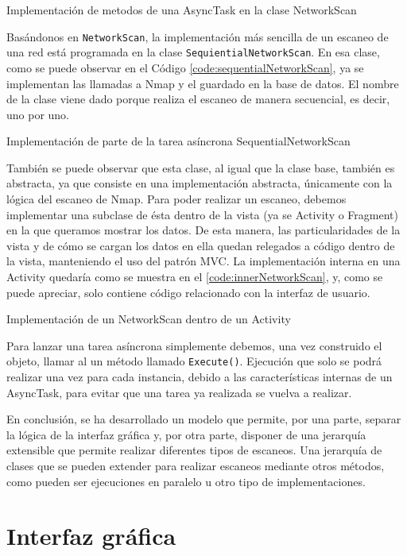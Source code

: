 \begin{code}
	\caption{Implementación de metodos de una AsyncTask en la clase NetworkScan}
	\label{code:networkScan}
	
\end{code}

Basándonos en \texttt{NetworkScan}, la implementación más sencilla de un escaneo de una red está programada en la clase \texttt{SequientialNetworkScan}. En esa clase, como se puede observar en el Código \ref{code:sequentialNetworkScan}, ya se implementan las llamadas a Nmap y el guardado en la base de datos. El nombre de la clase viene dado porque realiza el escaneo de manera secuencial, es decir, uno por uno.

\begin{code}
	\caption{Implementación de parte de la tarea asíncrona SequentialNetworkScan}
	\label{code:sequentialNetworkScan}
	
\end{code}

También se puede observar que esta clase, al igual que la clase base, también es abstracta, ya que consiste en una implementación abstracta, únicamente con la lógica del escaneo de Nmap. Para poder realizar un escaneo, debemos implementar una subclase de ésta dentro de la vista (ya se Activity o Fragment) en la que queramos mostrar los datos. De esta manera, las particularidades de la vista y de cómo se cargan los datos en ella quedan relegados a código dentro de la vista, manteniendo el uso del patrón MVC. La implementación interna en una Activity quedaría como se muestra en el \ref{code:innerNetworkScan}, y, como se puede apreciar, solo contiene código relacionado con la interfaz de usuario.

\begin{code}
	\caption{Implementación de un NetworkScan dentro de un Activity}
	\label{code:innerNetworkScan}
	
\end{code}

Para lanzar una tarea asíncrona simplemente debemos, una vez construido el objeto, llamar al un método llamado \texttt{Execute()}. Ejecución que solo se podrá realizar una vez para cada instancia, debido a las características internas de un AsyncTask, para evitar que una tarea ya realizada se vuelva a realizar.

En conclusión, se ha desarrollado un modelo que permite, por una parte, separar la lógica de la interfaz gráfica y, por otra parte, disponer de una jerarquía extensible que permite realizar diferentes tipos de escaneos. Una jerarquía de clases que se pueden extender para realizar escaneos mediante otros métodos, como pueden ser ejecuciones en paralelo u otro tipo de implementaciones.


\section{Interfaz gráfica}


